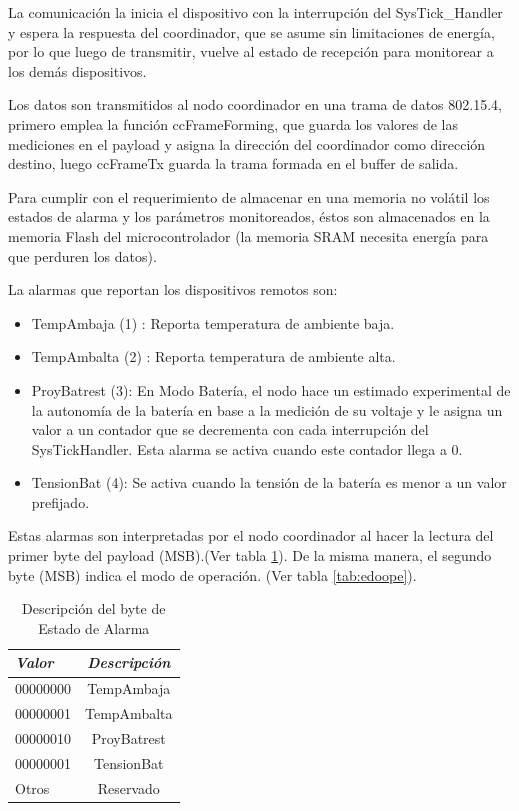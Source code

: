 {La comunicación la inicia el dispositivo con la interrupción del SysTick\_Handler y espera la respuesta del coordinador, que se asume sin limitaciones de energía, por lo que luego de transmitir, vuelve al estado de recepción para monitorear a los demás dispositivos.

Los datos son transmitidos al nodo coordinador en una trama de datos 802.15.4, primero emplea la función ccFrameForming, que guarda los valores de las mediciones en el payload y asigna la dirección del coordinador como dirección destino, luego ccFrameTx guarda la trama formada en el buffer de salida.

Para cumplir con el requerimiento de almacenar en una memoria no volátil los estados de alarma y los parámetros monitoreados, éstos son almacenados en la memoria Flash del microcontrolador (la memoria SRAM necesita energía para que perduren los datos). 

\noindent La alarmas que reportan los dispositivos remotos son:
	\begin{itemize}
	\item TempAmbaja (1) : Reporta temperatura de ambiente baja.
	\item TempAmbalta (2) : Reporta temperatura de ambiente alta.
	\item ProyBatrest (3): En Modo Batería, el nodo hace un estimado experimental de la autonomía de la batería en base a la medición de su voltaje y le asigna un valor a un contador que se decrementa con cada interrupción del SysTickHandler. Esta alarma se activa cuando este contador llega a 0.
	\item TensionBat (4): Se activa cuando la tensión de la batería es menor a un valor prefijado.
	\end{itemize}
	
Estas alarmas son interpretadas por el nodo coordinador al hacer la lectura del primer byte del payload (MSB).(Ver tabla \ref{tab:edoalarm}). De la misma manera, el segundo byte (MSB) indica el modo de operación. (Ver tabla \ref{tab:edoope}).

\vspace{10px}
\begin{table}[ht]
	\centering
	\caption{Descripción del byte de Estado de Alarma}
	\begin{tabular}{@{} l *1c @{}}    \toprule
		\emph{\textbf{Valor}} & \emph{\textbf{Descripción}}\\
		\midrule
		00000000 & TempAmbaja\\	
		00000001 & TempAmbalta\\
		00000010 & ProyBatrest\\
		00000001 & TensionBat\\
		Otros & Reservado\\
		\bottomrule
		\hline
	\end{tabular}
	\label{tab:edoalarm}
\end{table}

}
